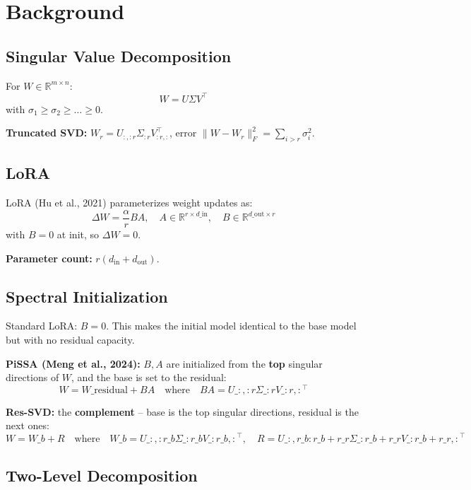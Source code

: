 \section{Background}

\subsection{Singular Value Decomposition}

For $W \in \mathbb{R}^{m \times n}$:
\[
W = U \Sigma V^\top
\tag{3.1}
\]
with $\sigma_1 \geq \sigma_2 \geq \dots \geq 0$.

\textbf{Truncated SVD:} $W_r = U_{:, :r} \Sigma_{:r} V_{:r, :}^\top$, error 
$\|W - W_r\|_F^2 = \sum_{i > r} \sigma_i^2$.

\subsection{LoRA}

LoRA (Hu et al., 2021) parameterizes weight updates as:
\[
\Delta W = \frac{\alpha}{r} B A, \quad A \in \mathbb{R}^{r \times d\_\text{in}}, \quad B \in \mathbb{R}^{d\_\text{out} \times r}
\tag{3.2}
\]
with $B = 0$ at init, so $\Delta W = 0$.

\textbf{Parameter count:} $r(d_\text{in} + d_\text{out})$.

\subsection{Spectral Initialization}

Standard LoRA: $B = 0$. This makes the initial model identical to the 
base model but with no residual capacity.

\textbf{PiSSA (Meng et al., 2024):} $B, A$ are initialized from the \textbf{top} 
singular directions of $W$, and the base is set to the residual:
\[
W = W\_\text{residual} + B A \quad \text{where} \quad B A = U\_{:, :r} \Sigma\_{:r} V\_{:r, :}^\top
\tag{3.3}
\]

\textbf{Res-SVD:} the \textbf{complement} -- base is the top singular directions, 
residual is the next ones:
\[
W = W\_b + R \quad \text{where} \quad W\_b = U\_{:, :r\_b} \Sigma\_{:r\_b} V\_{:r\_b, :}^\top, \quad R = U\_{:, r\_b:r\_b+r\_r} \Sigma\_{:r\_b+r\_r} V\_{:r\_b+r\_r, :}^\top
\tag{3.4}
\]

\subsection{Two-Level Decomposition}

